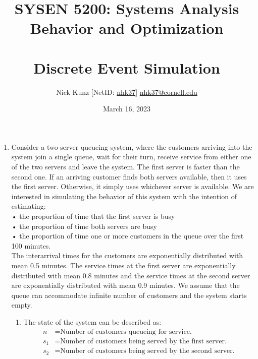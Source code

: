 \documentclass{article}
\begin{document}
\title{SYSEN 5200: Systems Analysis Behavior and Optimization\\~\\
    \Large Discrete Event Simulation
}
\author{
    Nick Kunz [NetID: \url{nhk37}] \hyperlink{nhk37@cornell.edu}{nhk37@cornell.edu}}
\date{March 16, 2023}
\maketitle
\thispagestyle{fancy}


\begin{enumerate}

    \item Consider a two-server queueing system, where the customers arriving into the system join a single queue, wait for their turn, receive service from either one of the two servers and leave the system. The first server is faster than the second one. If an arriving customer finds both servers available, then it uses the first server. Otherwise, it simply uses whichever server is available. We are interested in simulating the behavior of this system with the intention of estimating:\\

    • the proportion of time that the first server is busy\\
    • the proportion of time both servers are busy\\
    • the proportion of time one or more customers in the queue over the first 100 minutes.\\

    The interarrival times for the customers are exponentially distributed with mean 0.5 minutes. The service times at the first server are exponentially distributed with mean 0.8 minutes and the service times at the second server are exponentially distributed with mean 0.9 minutes. We assume that the queue can accommodate infinite number of customers and the system starts empty.

    \begin{enumerate}
        \item The state of the system can be described as:
        \begin{equation}
            \begin{split}
                n &= \text{Number of customers queueing for service.}\\
                s_1 &= \text{Number of customers being served by the first server.}\\
                s_2 &= \text{Number of customers being served by the second server.}\\
            \end{split}
        \end{equation}


\end{enumerate}
\end{enumerate}
\end{document}
